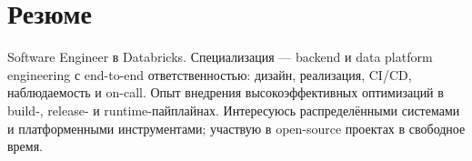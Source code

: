 \section{Резюме}
\small{Software Engineer в Databricks. Специализация --- backend и data platform engineering с end-to-end ответственностью: дизайн, реализация, CI/CD, наблюдаемость и on-call. Опыт внедрения высокоэффективных оптимизаций в build-, release- и runtime-пайплайнах. Интересуюсь распределёнными системами и платформенными инструментами; участвую в open-source проектах в свободное время.}
\vspace{-5pt}